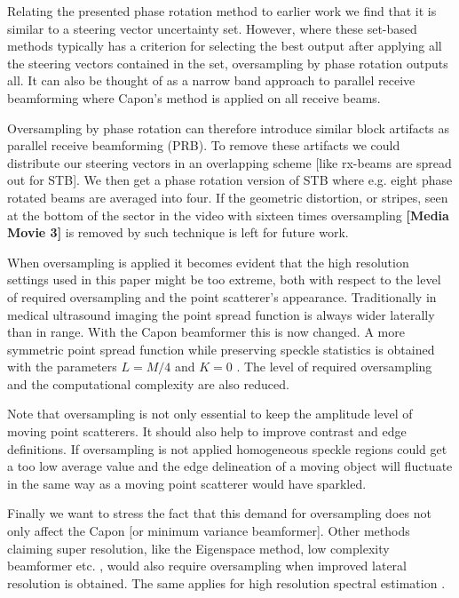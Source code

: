 \documentclass[draftcls]{IEEEtran}
\newcommand\multimedia[1]{\textbf{{\color{red}[#1]}}}
\begin{document}
Relating the presented phase rotation method to earlier work we find that it is similar to a steering vector uncertainty set. However, where these set-based methods typically has a criterion for selecting the best output after applying all the steering vectors contained in the set, oversampling by phase rotation outputs all. It can also be thought of as a narrow band approach to parallel receive beamforming where Capon's method is applied on all receive beams.

Oversampling by phase rotation can therefore introduce similar block artifacts as parallel receive beamforming (PRB). To remove these artifacts we could distribute our steering vectors in an overlapping scheme [like rx-beams are spread out for STB]. We then get a phase rotation version of STB where e.g. eight phase rotated beams are averaged into four. If the geometric distortion, or stripes, seen at the bottom of the sector in the video with sixteen times oversampling \multimedia{Media Movie 3} is removed by such technique is left for future work.

When oversampling is applied it becomes evident that the high resolution settings used in this paper might be too extreme, both with respect to the level of required oversampling and the point scatterer's appearance. Traditionally in medical ultrasound imaging the point spread function is always wider laterally than in range. With the Capon beamformer this is now changed. A more symmetric point spread function while preserving speckle statistics is obtained with the parameters $L=M/4$ and $K=0$ \cite{Synnevag2007a}. The level of required oversampling and the computational complexity are also reduced. %

Note that oversampling is not only essential to keep the amplitude level of moving point scatterers. It should also help to improve contrast and edge definitions. If oversampling is not applied homogeneous speckle regions could get a too low average value and the edge delineation of a moving object will fluctuate in the same way as a moving point scatterer would have sparkled.

Finally we want to stress the fact that this demand for oversampling does not only affect the Capon [or minimum variance beamformer]. Other methods claiming super resolution, like the Eigenspace method, low complexity beamformer etc. \cite{Synnevag2011, Nilsen2009, Mehdizadeh2012a, Kim}, would also require oversampling when improved lateral resolution is obtained. The same applies for high resolution spectral estimation \cite{Ekroll2012}.
\end{document}
